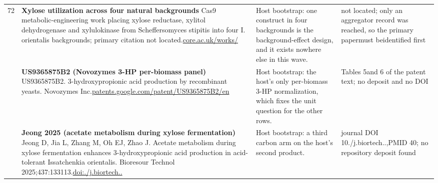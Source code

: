 \begin{landscape}
\begin{longtable}{@{}r@{\hspace{4pt}} L{78mm} L{72mm} L{76mm}@{}}
72 & \textbf{Xylose utilization across four natural backgrounds} \newline Cas9 metabolic-engineering work placing xylose reductase, xylitol dehydrogenase and xylulokinase from Scheffersomyces stipitis into four I. orientalis backgrounds; primary citation not located.\newline \href{https://core.ac.uk/works/286100561}{core.\allowbreak ac.\allowbreak uk/\allowbreak works/} & Host bootstrap: one construct in four backgrounds is the background-effect design, and it exists nowhere else in this wave. & not loca\allowbreak ted; onl\allowbreak y an agg\allowbreak regator \allowbreak record w\allowbreak as reach\allowbreak ed, so t\allowbreak he prima\allowbreak ry paper\allowbreak  must be\allowbreak  identif\allowbreak ied firs\allowbreak t \\
 & \textbf{US9365875B2 (Novozymes 3-HP per-biomass panel)} \newline US9365875B2. 3-hydroxypropionic acid production by recombinant yeasts. Novozymes Inc.\newline \href{https://patents.google.com/patent/US9365875B2/en}{patents.\allowbreak google.\allowbreak com/\allowbreak patent/\allowbreak US93658\allowbreak 75B2/\allowbreak en} & Host bootstrap: the host's only per-biomass 3-HP normalization, which fixes the unit question for the other rows. & Tables 5\allowbreak  and 6 o\allowbreak f the pa\allowbreak tent tex\allowbreak t; no de\allowbreak posit an\allowbreak d no DOI \\
 & \textbf{Jeong 2025 (acetate metabolism during xylose fermentation)} \newline Jeong D, Jia L, Zhang M, Oh EJ, Zhao J. Acetate metabolism during xylose fermentation enhances 3-hydroxypropionic acid production in acid-tolerant Issatchenkia orientalis. Bioresour Technol 2025;437:133113.\newline \href{https://doi.org/10.1016/j.biortech.2025.133113}{doi:./\allowbreak j.\allowbreak biortec\allowbreak h..} & Host bootstrap: a third carbon arm on the host's second product. & journal \allowbreak DOI 10./\allowbreak j.\allowbreak biortec\allowbreak h..,\allowbreak  PMID 40; \allowbreak no repos\allowbreak itory de\allowbreak posit fo\allowbreak und \\

\end{longtable}
\end{landscape}
